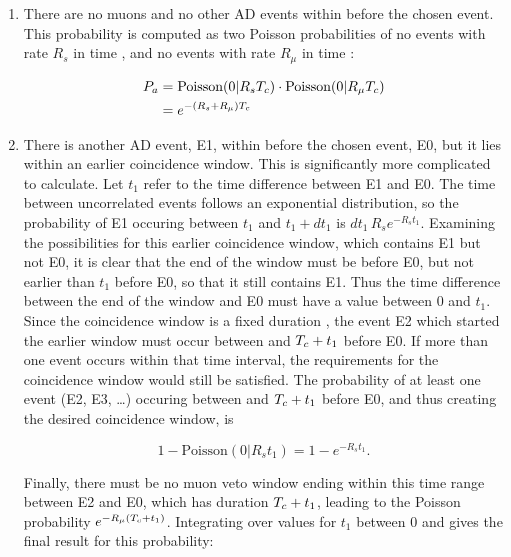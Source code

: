 \renewcommand{\labelenumi}{(\alph{enumi})}
\begin{enumerate}
    \item There are no muons and no other AD events
        within \tc{} before the chosen event.
        This probability is computed as two Poisson probabilities of
        no events with rate $R_s$ in time \tc,
        and no events with rate $R_\mu$ in time \tc:

        \begin{align*}
            P_a &= \text{Poisson}(0\vert R_sT_c)\cdot\text{Poisson}(0\vert R_\mu T_c) \\
                &= e^{-\left(R_s + R_\mu\right)T_c}
        \end{align*}

    \item There is another AD event, E1, within \tc{}
        before the chosen event, E0,
        but it lies within an earlier coincidence window.
        This is significantly more complicated to calculate.
        Let $t_1$ refer to the time difference between E1 and E0.
        The time between uncorrelated events follows an exponential distribution,
        so the probability of E1 occuring between $t_1$ and $t_1+dt_1$ is
        $dt_1\,R_se^{-R_st_1}$.
        Examining the possibilities for this earlier coincidence window,
        which contains E1 but not E0,
        it is clear that the end of the window must be before E0,
        but not earlier than $t_1$ before E0, so that it still contains E1.
        Thus the time difference between the end of the window and E0
        must have a value between 0 and $t_1$.
        Since the coincidence window is a fixed duration \tc{},
        the event E2 which started the earlier window must occur
        between \tc{} and $T_c + t_1$ before E0.
        If more than one event occurs within that time interval,
        the requirements for the coincidence window would still be satisfied.
        The probability of at least one event (E2, E3, \ldots) occuring
        between \tc{} and $T_c + t_1$ before E0,
        and thus creating the desired coincidence window, is

        \begin{equation*}
            1-\text{Poisson}(0\vert R_s t_1) = 1-e^{-R_st_1}.
        \end{equation*}

        Finally, there must be no muon veto window ending within this time range
        between E2 and E0, which has duration $T_c + t_1$,
        leading to the Poisson probability $e^{-R_\mu(T_c+t_1)}$.
        Integrating over values for $t_1$ between $0$ and \tc{}
        gives the final result for this probability:


\end{enumerate}
